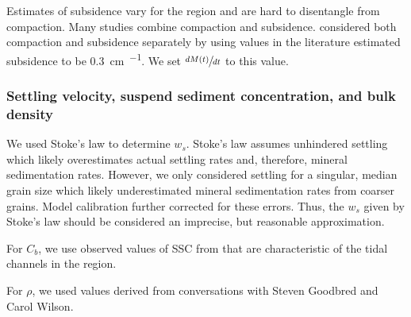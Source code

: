 Estimates of subsidence vary for the region and are hard to disentangle from compaction. Many studies \citep{pethickRapidRiseEffective2013,goodbredSignificanceLargeSediment2000,stanleyHoloceneDepositionalPatterns2000} combine compaction and subsidence. \citet{auerbachFloodRiskNatural2015} considered both compaction and subsidence separately by using values in the literature \citep{pethickRapidRiseEffective2013,goodbredSignificanceLargeSediment2000,stanleyHoloceneDepositionalPatterns2000} estimated subsidence to be \SI{0.3}{\centi\meter\per\year}. We set $\sfrac{dM(t)}{dt}$ to this value.

\subsubsection*{Settling velocity, suspend sediment concentration, and bulk density}

We used Stoke's law to determine $w_s$. Stoke's law assumes unhindered settling which likely overestimates actual settling rates and, therefore, mineral sedimentation rates. However, we only considered settling for a singular, median grain size which likely underestimated mineral sedimentation rates from coarser grains. Model calibration further corrected for these errors. Thus, the $w_s$ given by Stoke's law should be considered an imprecise, but reasonable approximation.

For $C_{b}$, we use observed values of SSC from \citet{haleObservationsScalingTidal2019} that are characteristic of the tidal channels in the region.

For $\rho$, we used values derived from conversations with Steven Goodbred and Carol Wilson.